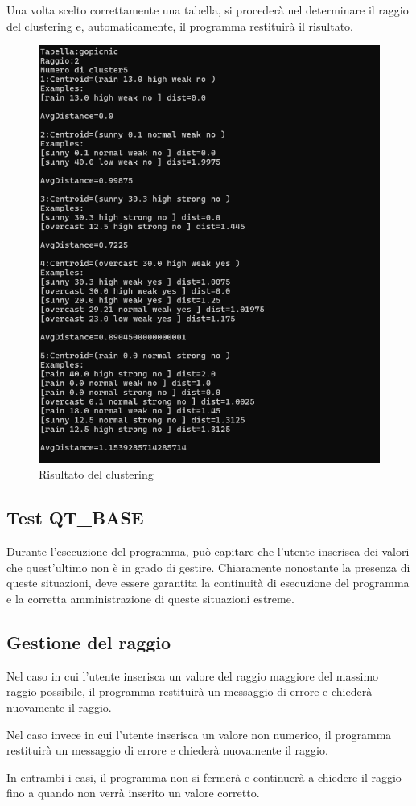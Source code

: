 Una volta scelto correttamente una tabella, si procederà nel determinare il raggio del clustering e, automaticamente, il programma restituirà il risultato. 

\begin{figure}[h!]
    \centering
    \includegraphics[width = 0.5 \textwidth]{images/risultato atteso.png}
    \caption{Risultato del clustering}
\end{figure}

\subsection{Test QT\_BASE}

Durante l'esecuzione del programma, può capitare che l'utente inserisca dei valori che quest'ultimo non è in grado di gestire. Chiaramente nonostante la presenza di queste situazioni, deve essere garantita la continuità di esecuzione del programma e la corretta amministrazione di queste situazioni estreme.

\subsection*{Gestione del raggio}

Nel caso in cui l'utente inserisca un valore del raggio maggiore del massimo raggio possibile, il programma restituirà un messaggio di errore e chiederà nuovamente il raggio.

Nel caso invece in cui l'utente inserisca un valore non numerico, il programma restituirà un messaggio di errore e chiederà nuovamente il raggio.

In entrambi i casi, il programma non si fermerà e continuerà a chiedere il raggio fino a quando non verrà inserito un valore corretto.

